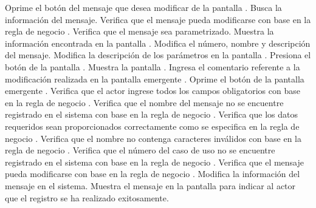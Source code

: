  \begin{UCtrayectoria}
    \UCpaso[\UCactor] Oprime el botón \btnEditar del mensaje que desea modificar de la pantalla .
	\UCpaso[\UCsist] Busca la información del mensaje.
	\UCpaso[\UCsist] Verifica que el mensaje pueda modificarse con base en la regla de negocio . 
    \UCpaso[\UCsist] Verifica que el mensaje sea parametrizado.
    \UCpaso[\UCsist] Muestra la información encontrada en la pantalla .  
    \UCpaso[\UCactor] Modifica el número, nombre y descripción del mensaje. \label{cu9.2:ingresaDatosPrincipal}
    \UCpaso[\UCactor] Modifica la descripción de los parámetros en la pantalla .  
    \UCpaso[\UCactor] Presiona el botón  de la pantalla . \label{cu9.2:aceptar}  
    \UCpaso[\UCsist] Muestra la pantalla .
    \UCpaso[\UCactor] Ingresa el comentario referente a la modificación realizada en la pantalla emergente . \label{cu9.2:ingresaComentario}
    \UCpaso[\UCactor] Oprime el botón  de la pantalla emergente . 	
    \UCpaso[\UCsist] Verifica que el actor ingrese todos los campos obligatorios con base en la regla de negocio  . 
    \UCpaso[\UCsist] Verifica que el nombre del mensaje no se encuentre registrado en el sistema con base en la regla de negocio  . 
	\UCpaso[\UCsist] Verifica que los datos requeridos sean proporcionados correctamente como se especifica en la regla de negocio . 
    \UCpaso[\UCsist] Verifica que el nombre no contenga caracteres inválidos con base en la regla de negocio . 
    \UCpaso[\UCsist] Verifica que el número del caso de uso no se encuentre registrado en el sistema con base en la regla de negocio  . 
	\UCpaso[\UCsist] Verifica que el mensaje pueda modificarse con base en la regla de negocio . 
    \UCpaso[\UCsist] Modifica la información del mensaje en el sistema.
    \UCpaso[\UCsist] Muestra el mensaje  en la pantalla 
    para indicar al actor que el registro se ha realizado exitosamente.
 \end{UCtrayectoria}
 
